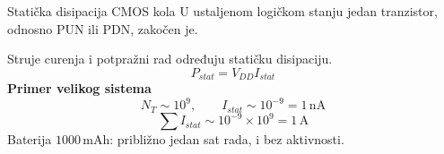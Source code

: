 \begin{frame}[label=09_2-s053]{Statička disipacija CMOS kola}
U ustaljenom logičkom stanju jedan tranzistor, odnosno PUN ili PDN, zakočen je.
\par\medskip Struje curenja i potpražni rad određuju statičku disipaciju.
\[P_{stat}=V_{DD}I_{stat}\]
\textbf{Primer velikog sistema}
\[N_T\sim10^9,\qquad I_{stat}\sim10^{-9}=1\,\mathrm{nA}\]
\[\sum I_{stat}\sim10^{-9}\times10^9=1\,\mathrm A\]
Baterija $1000\,\mathrm{mAh}$: približno jedan sat rada, i bez aktivnosti.
\end{frame}
